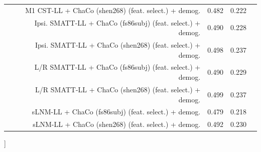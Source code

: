 \documentclass[phd,tocprelim]{cornell}
\renewcommand{\caption}[1]{\singlespacing\hangcaption{#1}\normalspacing}
\begin{document}
\begin{table}[h]
\begin{scriptsize}
\begin{tabular}{lrrll}
 & M1 CST-LL + ChaCo (shen268) (feat. select.) + demog. & 0.482 & 0.222 \\
 & Ipsi. SMATT-LL + ChaCo (fs86subj) (feat. select.) + demog. & 0.490 & 0.228 \\
 & Ipsi. SMATT-LL + ChaCo (shen268) (feat. select.) + demog. & 0.498 & 0.237 \\
 & L/R SMATT-LL + ChaCo (fs86subj) (feat. select.) + demog. & 0.490 & 0.229 \\
 & L/R SMATT-LL + ChaCo (shen268) (feat. select.) + demog. & 0.499 & 0.237 \\
 & sLNM-LL + ChaCo (fs86subj) (feat. select.) + demog. & 0.479 & 0.218 \\
 & sLNM-LL + ChaCo (shen268) (feat. select.) + demog. & 0.492 & 0.230 \\

\bottomrule
\end{tabular}
\end{scriptsize}
		\ContinuedFloat
		\captionsetup{labelformat=adja-page}
		    \caption[]{}

\end{table}



\null
\vfill
\clearpage
\null
\vfill
\end{document}
